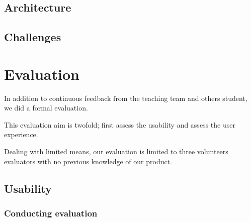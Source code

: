 \documentclass[11pt,a4paper]{article}
\begin{document}

\subsection{Architecture}




\subsection{Challenges}







\section{Evaluation} \label{eval}

In addition to continuous feedback from the teaching team and others student, we did a formal evaluation.

This evaluation aim is twofold; first assess the usability and assess the user experience.

Dealing with limited means, our evaluation is limited to three volunteers evaluators with no previous knowledge of our product.





\subsection{Usability}

\subsubsection{Conducting evaluation}
\end{document}

